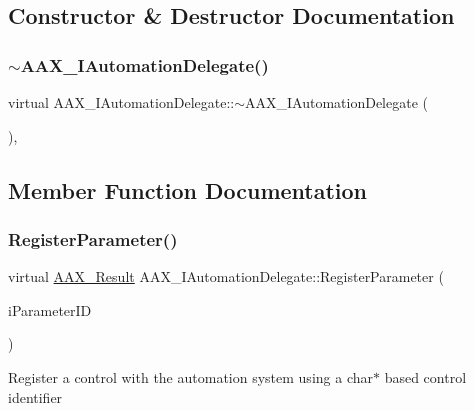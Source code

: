 \subsection{Constructor \& Destructor Documentation}
\mbox{\label{a01773_a566c6c261d00207024a07990c86f9694}} 
\subsubsection{\texorpdfstring{$\sim$AAX\_IAutomationDelegate()}{~AAX\_IAutomationDelegate()}}
{\footnotesize\ttfamily virtual A\+A\+X\+\_\+\+I\+Automation\+Delegate\+::$\sim$\+A\+A\+X\+\_\+\+I\+Automation\+Delegate (\begin{DoxyParamCaption}{ }\end{DoxyParamCaption})\hspace{0.3cm}{\ttfamily [inline]}, {\ttfamily [virtual]}}



\subsection{Member Function Documentation}
\mbox{\label{a01773_a4d91efb2d922729d02e2ea7d7a05ed10}} 
\subsubsection{\texorpdfstring{RegisterParameter()}{RegisterParameter()}}
{\footnotesize\ttfamily virtual \mbox{\hyperlink{a00392_a4d8f69a697df7f70c3a8e9b8ee130d2f}{A\+A\+X\+\_\+\+Result}} A\+A\+X\+\_\+\+I\+Automation\+Delegate\+::\+Register\+Parameter (\begin{DoxyParamCaption}\item[{\mbox{\hyperlink{a00392_a1440c756fe5cb158b78193b2fc1780d1}{A\+A\+X\+\_\+\+C\+Param\+ID}}}]{i\+Parameter\+ID }\end{DoxyParamCaption})\hspace{0.3cm}{\ttfamily [pure virtual]}}

Register a control with the automation system using a char$\ast$ based control identifier

